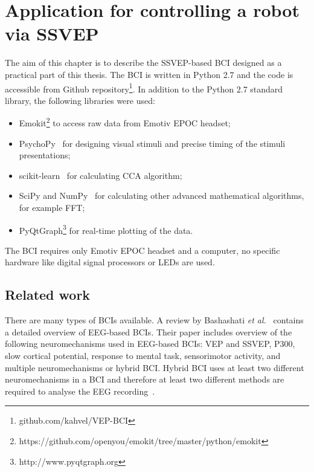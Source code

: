 
\chapter{Application for controlling a robot via SSVEP}
\label{sec:SSVEP_BCI}

The aim of this chapter is to describe the \gls{SSVEP}-based \gls{BCI} designed as a practical part of this thesis. The \gls{BCI} is written in Python 2.7 and the code is accessible from Github repository\footnote{github.com/kahvel/VEP-BCI}. In addition to the Python 2.7 standard library, the following libraries were used:
\begin{itemize}
	\item Emokit\footnote{https://github.com/openyou/emokit/tree/master/python/emokit} to access raw data from Emotiv EPOC headset;
	\item PsychoPy~\cite{psychopy} for designing visual stimuli and precise timing of the stimuli presentations;
	\item scikit-learn~\cite{scikit-learn} for calculating \gls{CCA} algorithm;
	\item SciPy and NumPy~\cite{scipy} for calculating other advanced mathematical algorithms, for example \gls{FFT};
	\item PyQtGraph\footnote{http://www.pyqtgraph.org} for real-time plotting of the data.
\end{itemize} The \gls{BCI} requires only Emotiv EPOC headset and a computer, no specific hardware like digital signal processors or \glspl{LED} are used.

\section{Related work}

There are many types of \glspl{BCI} available. A review by Bashashati \textit{et al.}~\cite{bci_comparison} contains a detailed overview of \gls{EEG}-based \glspl{BCI}. Their paper includes overview of the following neuromechanisms used in \gls{EEG}-based \glspl{BCI}: \gls{VEP} and \gls{SSVEP}, P300, slow cortical potential, response to mental task, sensorimotor activity, and multiple neuromechanisms or hybrid \gls{BCI}. Hybrid \gls{BCI} uses at least two different neuromechanisms in a \gls{BCI} and therefore at least two different methods are required to analyse the \gls{EEG} recording~\cite{hybrid_bci, hybrid_bci2}.

